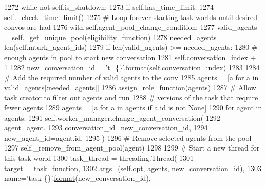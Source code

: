 \begin{DoxyCode}
1272         \textcolor{keywordflow}{while} \textcolor{keywordflow}{not} self.is\_shutdown:
1273             \textcolor{keywordflow}{if} self.has\_time\_limit:
1274                 self.\_check\_time\_limit()
1275             \textcolor{comment}{# Loop forever starting task worlds until desired convos are had}
1276             with self.agent\_pool\_change\_condition:
1277                 valid\_agents = self.\_get\_unique\_pool(eligibility\_function)
1278                 needed\_agents = len(self.mturk\_agent\_ids)
1279                 \textcolor{keywordflow}{if} len(valid\_agents) >= needed\_agents:
1280                     \textcolor{comment}{# enough agents in pool to start new conversation}
1281                     self.conversation\_index += 1
1282                     new\_conversation\_id = \textcolor{stringliteral}{'t\_\{\}'}.\hyperlink{namespaceparlai_1_1chat__service_1_1services_1_1messenger_1_1shared__utils_a32e2e2022b824fbaf80c747160b52a76}{format}(self.conversation\_index)
1283 
1284                     \textcolor{comment}{# Add the required number of valid agents to the conv}
1285                     agents = [a \textcolor{keywordflow}{for} a \textcolor{keywordflow}{in} valid\_agents[:needed\_agents]]
1286                     assign\_role\_function(agents)
1287                     \textcolor{comment}{# Allow task creator to filter out agents and run}
1288                     \textcolor{comment}{# versions of the task that require fewer agents}
1289                     agents = [a \textcolor{keywordflow}{for} a \textcolor{keywordflow}{in} agents \textcolor{keywordflow}{if} a.id \textcolor{keywordflow}{is} \textcolor{keywordflow}{not} \textcolor{keywordtype}{None}]
1290                     \textcolor{keywordflow}{for} agent \textcolor{keywordflow}{in} agents:
1291                         self.worker\_manager.change\_agent\_conversation(
1292                             agent=agent,
1293                             conversation\_id=new\_conversation\_id,
1294                             new\_agent\_id=agent.id,
1295                         )
1296                         \textcolor{comment}{# Remove selected agents from the pool}
1297                         self.\_remove\_from\_agent\_pool(agent)
1298 
1299                     \textcolor{comment}{# Start a new thread for this task world}
1300                     task\_thread = threading.Thread(
1301                         target=\_task\_function,
1302                         args=(self.opt, agents, new\_conversation\_id),
1303                         name=\textcolor{stringliteral}{'task-\{\}'}.\hyperlink{namespaceparlai_1_1chat__service_1_1services_1_1messenger_1_1shared__utils_a32e2e2022b824fbaf80c747160b52a76}{format}(new\_conversation\_id),

\end{DoxyCode}
